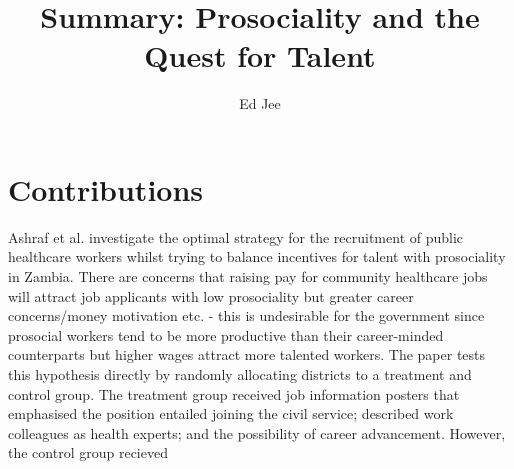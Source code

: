 \documentclass{article}
\author{Ed Jee}
\title{Summary: Prosociality and the Quest for Talent}
\begin{document}
\maketitle 


\section*{Contributions}


Ashraf et al. investigate the optimal strategy for the recruitment of public 
healthcare workers whilst trying to balance incentives for talent with prosociality 
in Zambia.
There are concerns that raising pay for community healthcare jobs will attract job applicants 
with low prosociality but greater career concerns/money motivation etc. - this 
is undesirable for the government since prosocial workers tend to be more 
productive than their career-minded counterparts but higher wages attract 
more talented workers. The paper tests this 
hypothesis directly by randomly allocating districts to a treatment and control 
group. The treatment group received job information posters that emphasised the 
position entailed joining the civil service; described work colleagues as 
health experts; and the possibility of career advancement. However, the control 
group recieved
\end{document}
